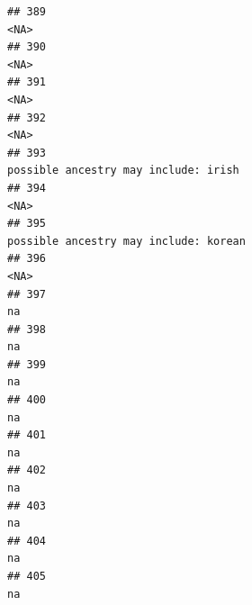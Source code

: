 \documentclass[]{article}
\begin{document}
\begin{verbatim}
## 389                                                                                                                                                <NA>
## 390                                                                                                                                                <NA>
## 391                                                                                                                                                <NA>
## 392                                                                                                                                                <NA>
## 393                                                                                                                possible ancestry may include: irish
## 394                                                                                                                                                <NA>
## 395                                                                                                               possible ancestry may include: korean
## 396                                                                                                                                                <NA>
## 397                                                                                                                                                  na
## 398                                                                                                                                                  na
## 399                                                                                                                                                  na
## 400                                                                                                                                                  na
## 401                                                                                                                                                  na
## 402                                                                                                                                                  na
## 403                                                                                                                                                  na
## 404                                                                                                                                                  na
## 405                                                                                                                                                  na

\end{verbatim}
\end{document}
